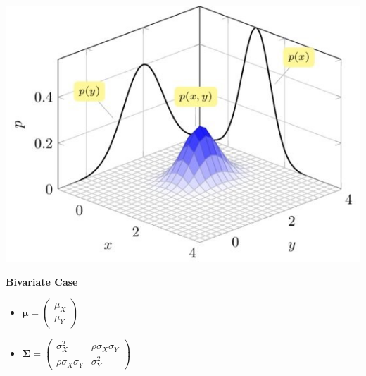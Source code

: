 \documentclass[DIV=14,titlepage=false]{scrreprt}
\begin{document}
\begin{minipage}[c]{0.5\textwidth}
\includegraphics[width=\textwidth]{./Images/bivariateNormal.jpeg}
\end{minipage}
\hfill
\begin{minipage}[c]{0.45\textwidth}
  \textbf{Bivariate Case}
  \begin{itemize}
    \item $\boldsymbol{\mu} = \begin{pmatrix} \mu_X \\ \mu_Y \end{pmatrix}$
    \item $\boldsymbol{\Sigma} = \begin{pmatrix} \sigma_X^2 & \rho\sigma_X\sigma_Y \\ \rho\sigma_X\sigma_Y & \sigma_Y^2 \end{pmatrix}$
  \end{itemize}
  
\end{minipage}\\\\
\end{document}
